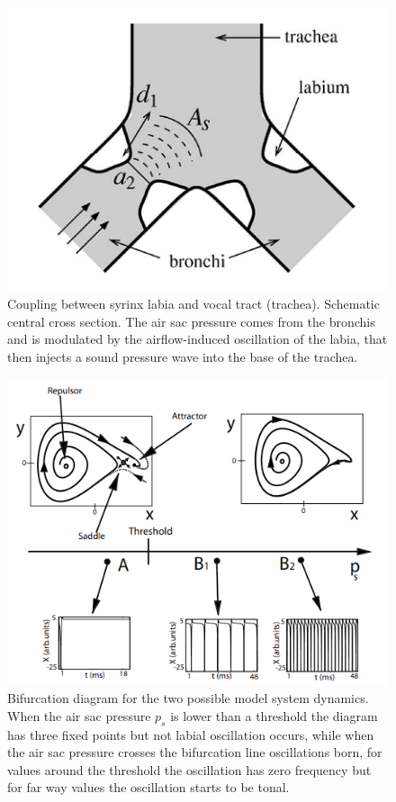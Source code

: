 \begin{minipage}{0.4\linewidth}
\begin{figure}[H]
    \centering
    \includegraphics[width=\linewidth]{Images/trachea_coupling.png}
    \caption{Coupling between syrinx labia and vocal tract (trachea). Schematic central cross section. The air sac pressure comes from the bronchis and is modulated by the airflow-induced oscillation of the labia, that then injects a sound pressure wave into the base of the trachea. \cite{source-source}}
    \label{fig:source-source}
\end{figure}    
\end{minipage}\hfill
\begin{minipage}{0.55\linewidth}
\begin{figure}[H]
    \centering
    \includegraphics[width=\linewidth]{Images/dynamical_bihavior.png}
    \caption{Bifurcation diagram for the two possible model system dynamics. When the air sac pressure $p_s $ is lower than a threshold the diagram has three fixed points but not labial oscillation occurs, while when the air sac pressure crosses the bifurcation line oscillations born, for values around the threshold the oscillation has zero frequency but for far way values the oscillation starts to be tonal. \cite{rich}}
    \label{fig:dynamical_behavior}
\end{figure}
\end{minipage}
